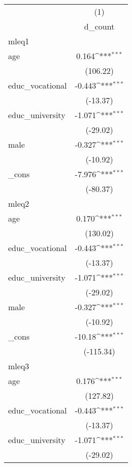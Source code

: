 {
\def\sym#1{\ifmmode^{#1}\else\(^{#1}\)\fi}
\begin{tabular}{l*{1}{c}}
\hline\hline
            &\multicolumn{1}{c}{(1)}\\
            &\multicolumn{1}{c}{d\_count}\\
\hline
mleq1       &                     \\
age         &       0.164\sym{***}\\
            &    (106.22)         \\
[1em]
educ\_vocational&      -0.443\sym{***}\\
            &    (-13.37)         \\
[1em]
educ\_university&      -1.071\sym{***}\\
            &    (-29.02)         \\
[1em]
male        &      -0.327\sym{***}\\
            &    (-10.92)         \\
[1em]
\_cons      &      -7.976\sym{***}\\
            &    (-80.37)         \\
\hline
mleq2       &                     \\
age         &       0.170\sym{***}\\
            &    (130.02)         \\
[1em]
educ\_vocational&      -0.443\sym{***}\\
            &    (-13.37)         \\
[1em]
educ\_university&      -1.071\sym{***}\\
            &    (-29.02)         \\
[1em]
male        &      -0.327\sym{***}\\
            &    (-10.92)         \\
[1em]
\_cons      &      -10.18\sym{***}\\
            &   (-115.34)         \\
\hline
mleq3       &                     \\
age         &       0.176\sym{***}\\
            &    (127.82)         \\
[1em]
educ\_vocational&      -0.443\sym{***}\\
            &    (-13.37)         \\
[1em]
educ\_university&      -1.071\sym{***}\\
            &    (-29.02)         \\

\end{tabular}}
